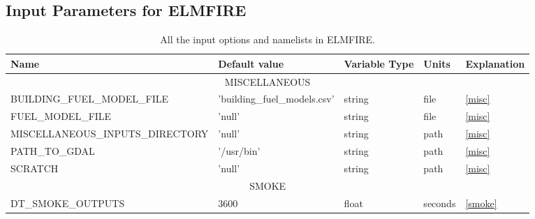 \begin{landscape}
\chapter{Input Parameters for ELMFIRE}


\begin{center}
\begin{longtable}{lllll}
\caption{All the input options and namelists in ELMFIRE. }
\label{tab:inputSwitches}\\
\textbf{Name}                                & \textbf{Default value}     & \textbf{Variable Type} & \textbf{Units}                     & \textbf{Explanation}                 \\
\toprule
\toprule
\multicolumn{5}{c}{MISCELLANEOUS}                                                                                                                                              \\
\toprule
BUILDING\_FUEL\_MODEL\_FILE                  & 'building\_fuel\_models.csv' & string               & file                               & \ref{misc}                           \\
FUEL\_MODEL\_FILE                            & 'null'                     & string                 & file                               & \ref{misc}                           \\
MISCELLANEOUS\_INPUTS\_DIRECTORY             & 'null'                     & string                 & path                               & \ref{misc}                           \\
PATH\_TO\_GDAL                               & '/usr/bin'                 & string                 & path                               & \ref{misc}                           \\
SCRATCH                                      & 'null'                     & string                 & path                               & \ref{misc}                           \\
\multicolumn{5}{c}{SMOKE}                                                                                                                                                      \\
\toprule
DT\_SMOKE\_OUTPUTS                           & 3600                       & float                  & seconds                            & \ref{smoke}                          \\

\end{longtable}
\end{center}
\end{landscape}
